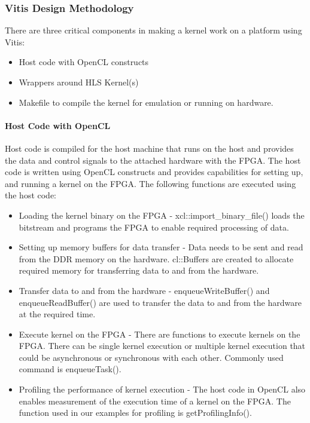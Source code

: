 \subsubsection{Vitis Design Methodology}
There are three critical components in making a kernel work on a platform using Vitis:

\begin{itemize}
    \item Host code with OpenCL constructs
    \item Wrappers around HLS Kernel(s)
    \item Makefile to compile the kernel for emulation or running on hardware.
\end{itemize}

\paragraph{Host Code with OpenCL}
Host code is compiled for the host machine that runs on the host and provides the data and control signals to the attached hardware with the FPGA. The host code is written using OpenCL constructs and provides capabilities for setting up, and running a kernel on the FPGA. The following functions are executed using the host code:
\begin{itemize}
  \item Loading the kernel binary on the FPGA - xcl::import\_binary\_file() loads the bitstream and programs the FPGA to enable required processing of data.
  \item Setting up memory buffers for data transfer - Data needs to be sent and read from the DDR memory on the hardware. cl::Buffers are created to allocate required memory for transferring data to and from the hardware.
  \item Transfer data to and from the hardware - enqueueWriteBuffer() and enqueueReadBuffer() are used to transfer the data to and from the hardware at the required time.
  \item Execute kernel on the FPGA - There are functions to execute kernels on the FPGA. There can be single kernel execution or multiple kernel execution that could be asynchronous or synchronous with each other. Commonly used command is enqueueTask().
  \item Profiling the performance of kernel execution - The host code in OpenCL also enables measurement of the execution time of a kernel on the FPGA. The function used in our examples for profiling is getProfilingInfo().
\end{itemize}

